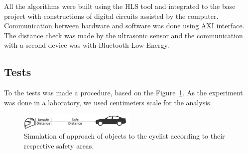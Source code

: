         
        All the algorithms were built using the HLS tool and integrated to the base project with constructions of digital circuits assisted by the computer.
        Communication between hardware and software was done using AXI interface.
        The distance check was made by the ultrasonic sensor and the communication with a second device was with Bluetooth Low Energy.
        
        
    \subsection{Tests}
        To the tests was made a procedure, based on the Figure~\ref{fig:distance}.
        As the experiment was done in a laboratory, we used centimeters scale for the analysis.
        
        \begin{figure}[h] \centering
            \includegraphics[width=0.5\textwidth]{img/distance.png}
            \caption{Simulation of approach of objects to the cyclist according to their respective safety areas.}
            \label{fig:distance}
        \end{figure}
    
